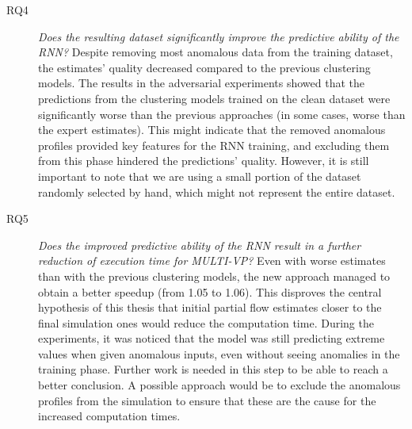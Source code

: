 \begin{description}
    \item[RQ4] \textit{Does the resulting dataset significantly improve the predictive ability of the RNN?} Despite removing most anomalous data from the training dataset, the estimates' quality decreased compared to the previous clustering models. The results in the adversarial experiments showed that the predictions from the clustering models trained on the clean dataset were significantly worse than the previous approaches (in some cases, worse than the expert estimates). This might indicate that the removed anomalous profiles provided key features for the RNN training, and excluding them from this phase hindered the predictions' quality. However, it is still important to note that we are using a small portion of the dataset randomly selected by hand, which might not represent the entire dataset.

    \item[RQ5] \textit{Does the improved predictive ability of the RNN result in a further reduction of execution
time for MULTI-VP?} Even with worse estimates than with the previous clustering models, the new approach managed to obtain a better speedup (from 1.05 to 1.06). This disproves the central hypothesis of this thesis that initial partial flow estimates closer to the final simulation ones would reduce the computation time. During the experiments, it was noticed that the model was still predicting extreme values when given anomalous inputs, even without seeing anomalies in the training phase. Further work is needed in this step to be able to reach a better conclusion. A possible approach would be to exclude the anomalous profiles from the simulation to ensure that these are the cause for the increased computation times.
\end{description} 